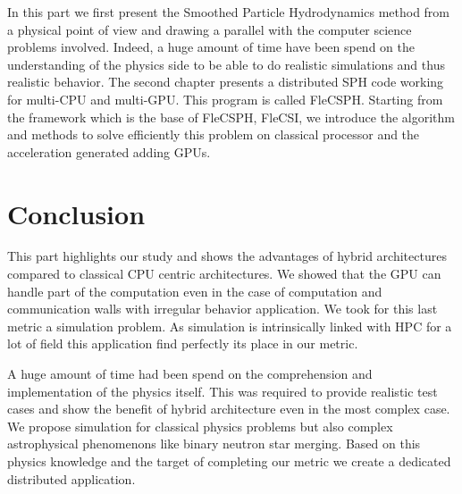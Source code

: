 In this part we first present the Smoothed Particle Hydrodynamics method from a physical point of view and drawing a parallel with the computer science problems involved. 
Indeed, a huge amount of time have been spend on the understanding of the physics side to be able to do realistic simulations and thus realistic behavior. 
The second chapter presents a distributed SPH code working for multi-CPU and multi-GPU. 
This program is called FleCSPH. 
Starting from the framework which is the base of FleCSPH, FleCSI, we introduce the algorithm and methods to solve efficiently this problem on classical processor and the acceleration generated adding GPUs. 







\chapter*{Conclusion}
This part highlights our study and shows the advantages of hybrid architectures compared to classical CPU centric architectures. 
We showed that the GPU can handle part of the computation even in the case of computation and communication walls with irregular behavior application. 
We took for this last metric a simulation problem. 
As simulation is intrinsically linked with HPC for a lot of field this application find perfectly its place in our metric.

A huge amount of time had been spend on the comprehension and implementation of the physics itself. 
This was required to provide realistic test cases and show the benefit of hybrid architecture even in the most complex case. 
We propose simulation for classical physics problems but also complex astrophysical phenomenons like binary neutron star merging. 
Based on this physics knowledge and the target of completing our metric we create a dedicated distributed application.

